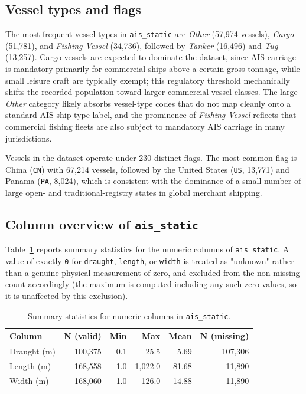 \documentclass[11pt,a4paper]{article}
\begin{document}
\subsection{Vessel types and flags}

The most frequent vessel types in \texttt{ais\_static} are \emph{Other}
(57{,}974 vessels), \emph{Cargo} (51{,}781), and \emph{Fishing Vessel}
(34{,}736), followed by \emph{Tanker} (16{,}496) and \emph{Tug} (13{,}257).
Cargo vessels are expected to
dominate the dataset, since AIS carriage is mandatory primarily for commercial
ships above a certain gross tonnage, while small leisure craft are typically
exempt; this regulatory threshold mechanically shifts the recorded population
toward larger commercial vessel classes. The large \emph{Other} category
likely absorbs vessel-type codes that do not map cleanly onto a standard AIS
ship-type label, and the prominence of \emph{Fishing Vessel} reflects that
commercial fishing fleets are also subject to mandatory AIS carriage in many
jurisdictions.

Vessels in the dataset operate under 230 distinct flags. The most common
flag is China (\texttt{CN}) with 67{,}214 vessels, followed by the United
States (\texttt{US}, 13{,}771) and Panama (\texttt{PA}, 8{,}024), which is
consistent with the dominance of a small number of large open- and
traditional-registry states in global merchant shipping.

\subsection{Column overview of \texttt{ais\_static}}

Table~\ref{tab:static-summary} reports summary statistics for the numeric
columns of \texttt{ais\_static}. A value of exactly \texttt{0} for
\texttt{draught}, \texttt{length}, or \texttt{width} is treated as "unknown"
rather than a genuine physical measurement of zero, and excluded from the
non-missing count accordingly (the maximum is computed including any such
zero values, so it is unaffected by this exclusion).

\begin{table}[h]
  \centering
  \caption{Summary statistics for numeric columns in \texttt{ais\_static}.}
  \label{tab:static-summary}
  \begin{tabular}{lrrrrr}
    \toprule
    Column & N (valid) & Min & Max & Mean & N (missing) \\
    \midrule
    Draught (m)  & 100{,}375 & 0.1 & 25.5    & 5.69  & 107{,}306 \\
    Length (m)   & 168{,}558 & 1.0 & 1{,}022.0 & 81.68 & 11{,}890 \\
    Width (m)    & 168{,}060 & 1.0 & 126.0   & 14.88 & 11{,}890 \\
    \bottomrule
  \end{tabular}
\end{table}
\end{document}
